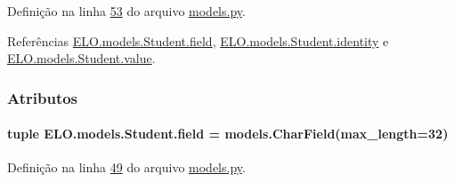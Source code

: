 Definição na linha \hyperlink{ELO_2models_8py_source_l00053}{53} do arquivo \hyperlink{ELO_2models_8py_source}{models.\+py}.



Referências \hyperlink{classELO_1_1models_1_1Student_a893ec9b2ece5c6b829fce5e5a7c1d576}{E\+L\+O.\+models.\+Student.\+field}, \hyperlink{classELO_1_1models_1_1Student_a20a7789a2b0f5b7d0c98453dcf38bc4e}{E\+L\+O.\+models.\+Student.\+identity} e \hyperlink{classELO_1_1models_1_1Student_a201226779dce6e064cb16bd92ed016e2}{E\+L\+O.\+models.\+Student.\+value}.




\subsubsection{Atributos}
\hypertarget{classELO_1_1models_1_1Student_a893ec9b2ece5c6b829fce5e5a7c1d576}{}
\paragraph[{field}]{\setlength{\rightskip}{0pt plus 5cm}tuple E\+L\+O.\+models.\+Student.\+field = models.\+Char\+Field(max\+\_\+length=32)\hspace{0.3cm}{\ttfamily [static]}}\label{classELO_1_1models_1_1Student_a893ec9b2ece5c6b829fce5e5a7c1d576}


Definição na linha \hyperlink{ELO_2models_8py_source_l00049}{49} do arquivo \hyperlink{ELO_2models_8py_source}{models.\+py}.



